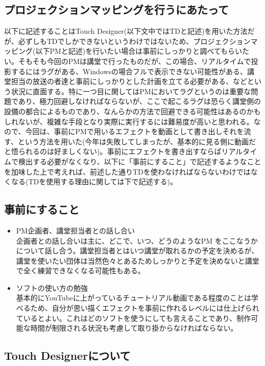 \documentclass[a4paper]{ltjsreport}
\begin{document}
\subsection{プロジェクションマッピングを行うにあたって}
以下に記述することはTouch Designer(以下文中ではTDと記述)を用いた方法だが、必ずしもTDでしかできないというわけではないため、プロジェクションマッピング(以下PMと記述)を行いたい場合は事前にしっかりと調べてもらいたい。そもそも今回のPMは講堂で行ったものだが、この場合、リアルタイムで投影するにはラグがある、Windowsの場合フルで表示できない可能性がある、講堂担当の放送の者達と事前にしっかりとした計画を立てる必要がある、などという状況に直面する。特に一つ目に関してはPMにおいてラグというのは重要な問題であり、極力回避しなければならないが、ここで起こるラグは恐らく講堂側の設備の都合によるものであり、なんらかの方法で回避できる可能性はあるのかもしれないが、複雑な手段となり実際に実行するには難易度が高いと思われる。なので、今回は、事前にPMで用いるエフェクトを動画として書き出しそれを流す、という方法を用いた(今年は失敗してしまったが、基本的に見る側に動画だと悟られるのは好ましくない)。事前にエフェクトを書き出すならばリアルタイムで検出する必要がなくなり、以下に「事前にすること」で記述するようなことを加味した上で考えれば、前述した通りTDを使わなければならないわけではなくなる(TDを使用する理由に関しては下で記述する)。

\subsection{事前にすること}
\begin{itemize}
  \item PM企画者、講堂担当者との話し合い\\
        企画者との話し合いは主に、どこで、いつ、どうのようなPM をここなうかについて話し合う。講堂担当者とはいつ講堂が取れるかの予定を決めるが、講堂を使いたい団体は当然色々とあるためしっかりと予定を決めないと講堂で全く練習できなくなる可能性もある。
  \item ソフトの使い方の勉強\\
        基本的にYouTubeに上がっているチュートリアル動画である程度のことは学べるため、自分が思い描くエフェクトを事前に作れるレベルには仕上げられているとよい。これはどのソフトを使うにしても言えることであり、制作可能な時間が制限される状況も考慮して取り掛からなければならない。
\end{itemize}

\subsection{Touch Designerについて}
\end{document}
